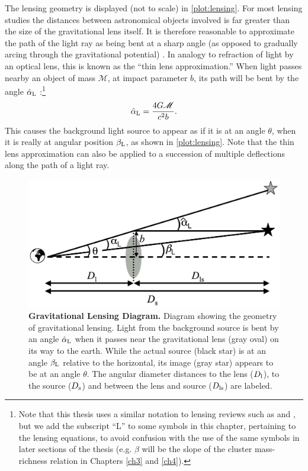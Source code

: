 The lensing geometry is displayed (not to scale) in \autoref{plot:lensing}. For most lensing studies the distances between astronomical objects involved is far greater than the size of the gravitational lens itself. It is therefore reasonable to approximate the path of the light ray as being bent at a sharp angle (as opposed to gradually arcing through the gravitational potential) \citep{BS01}. In analogy to refraction of light by an optical lens, this is known as the ``thin lens approximation.'' When light passes nearby an object of mass ${\mathscr M}$, at impact parameter $b$, its path will be bent by the angle $\hat{\alpha}_{\rm L}$ \citep{RydenText}:\footnote{Note that this thesis uses a similar notation to lensing reviews such as \citet{BS01} and \citet{Schneider06_WeakGravLens}, but we add the subscript ``L'' to some symbols in this chapter, pertaining to the lensing equations, to avoid confusion with the use of the same symbols in later sections of the thesis (e.g. $\beta$ will be the slope of the cluster mass-richness relation in Chapters \ref{ch3} and \ref{ch4}).}
\begin{equation}
\label{eqn:deflection}
\hat{\alpha}_{\rm L} = \frac{4G{\mathscr M}}{c^2 b}.
\end{equation}
This causes the background light source to appear as if it is at an angle $\theta$, when it is really at angular position $\beta_{\rm L}$, as shown in \autoref{plot:lensing}. Note that the thin lens approximation can also be applied to a succession of multiple deflections along the path of a light ray.

\begin{figure}
\begin{center}
\includegraphics[scale=0.4]{plots_intro/LensDiagram.png}
\caption[Gravitational Lensing Diagram]{{\bf Gravitational Lensing Diagram.} Diagram showing the geometry of gravitational lensing. Light from the background source is bent by an angle $\hat{\alpha}_{\rm L}$ when it passes near the gravitational lens (gray oval) on its way to the earth. While the actual source (black star) is at an angle $\beta_{\rm L}$ relative to the horizontal, its image (gray star) appears to be at an angle $\theta$. The angular diameter distances to the lens ($D_{\rm l}$), to the source ($D_{\rm s}$) and between the lens and source ($D_{\rm ls}$) are labeled.}
\label{plot:lensing}
\end{center}
\end{figure}

